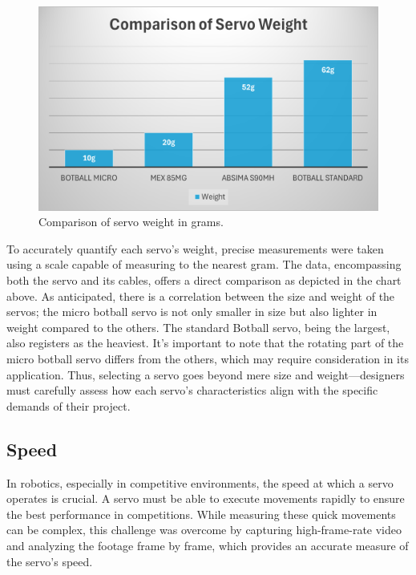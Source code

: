 \documentclass[conference]{IEEEtran}
\begin{document}
\begin{figure}[H]
\centering
\includegraphics[width=\linewidth]{weight_comparison_chart.png}
\caption{Comparison of servo weight in grams.}
\label{fig:weight_comparison}
\end{figure}

To accurately quantify each servo's weight, precise measurements were taken using a scale capable of measuring to the nearest gram. The data, encompassing both the servo and its cables, offers a direct comparison as depicted in the chart above. As anticipated, there is a correlation between the size and weight of the servos; the micro botball servo is not only smaller in size but also lighter in weight compared to the others. The standard Botball servo, being the largest, also registers as the heaviest. It's important to note that the rotating part of the micro botball servo differs from the others, which may require consideration in its application. Thus, selecting a servo goes beyond mere size and weight—designers must carefully assess how each servo's characteristics align with the specific demands of their project.

\subsection{Speed}
In robotics, especially in competitive environments, the speed at which a servo operates is crucial. A servo must be able to execute movements rapidly to ensure the best performance in competitions. While measuring these quick movements can be complex, this challenge was overcome by capturing high-frame-rate video and analyzing the footage frame by frame, which provides an accurate measure of the servo's speed.
\end{document}
